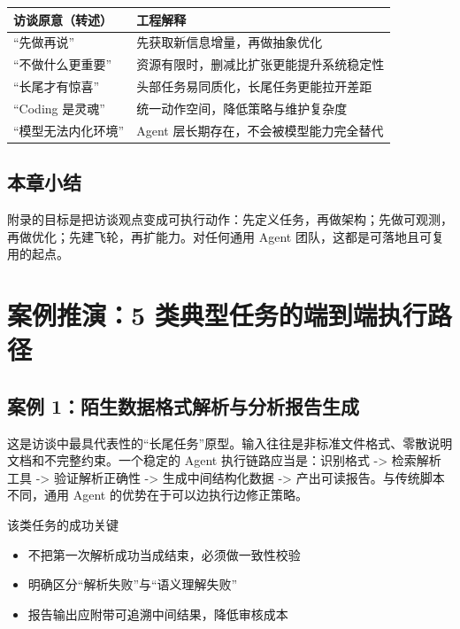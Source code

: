 \documentclass[a4paper]{article}
\begin{document}
\begin{center}
\begin{tabular}{p{5.4cm}p{7.2cm}}
\toprule
访谈原意（转述） & 工程解释 \\
\midrule
“先做再说” & 先获取新信息增量，再做抽象优化 \\
“不做什么更重要” & 资源有限时，删减比扩张更能提升系统稳定性 \\
“长尾才有惊喜” & 头部任务易同质化，长尾任务更能拉开差距 \\
“Coding 是灵魂” & 统一动作空间，降低策略与维护复杂度 \\
“模型无法内化环境” & Agent 层长期存在，不会被模型能力完全替代 \\
\bottomrule
\end{tabular}
\end{center}

\subsection{本章小结}

附录的目标是把访谈观点变成可执行动作：先定义任务，再做架构；先做可观测，再做优化；先建飞轮，再扩能力。对任何通用 Agent 团队，这都是可落地且可复用的起点。


\section{案例推演：5 类典型任务的端到端执行路径}

\subsection{案例 1：陌生数据格式解析与分析报告生成}

这是访谈中最具代表性的“长尾任务”原型。输入往往是非标准文件格式、零散说明文档和不完整约束。一个稳定的 Agent 执行链路应当是：识别格式 -> 检索解析工具 -> 验证解析正确性 -> 生成中间结构化数据 -> 产出可读报告。与传统脚本不同，通用 Agent 的优势在于可以边执行边修正策略。

\begin{importantbox}{该类任务的成功关键}
\begin{itemize}
    \item 不把第一次解析成功当成结束，必须做一致性校验
    \item 明确区分“解析失败”与“语义理解失败”
    \item 报告输出应附带可追溯中间结果，降低审核成本
\end{itemize}
\end{importantbox}
\end{document}
